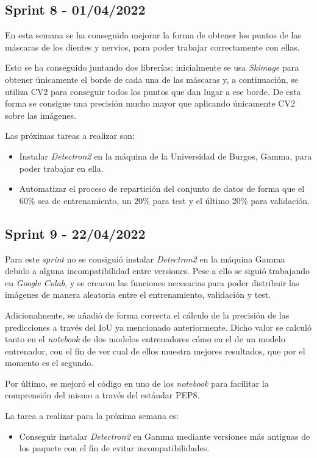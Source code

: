 \subsection{Sprint 8 - 01/04/2022}
En esta semana se ha conseguido mejorar la forma de obtener los puntos de las máscaras de los dientes y nervios, para poder trabajar correctamente con ellas. 

Esto se ha conseguido juntando dos librerías: inicialmente se usa \emph{Skimage} para obtener únicamente el borde de cada una de las máscaras y, a continuación, se utiliza CV2 para conseguir todos los puntos que dan lugar a ese borde. De esta forma se consigue una precisión mucho mayor que aplicando únicamente CV2 sobre las imágenes.

Las próximas tareas a realizar son:
\begin{itemize}
    \item Instalar \emph{Detectron2} en la máquina de la Universidad de Burgos, Gamma, para poder trabajar en ella.
    \item Automatizar el proceso de repartición del conjunto de datos de forma que el 60\% sea de entrenamiento, un 20\% para test y el último 20\% para validación. 
\end{itemize}
\subsection{Sprint 9 - 22/04/2022}
Para este \emph{sprint} no se consiguió instalar \emph{Detectron2} en la máquina Gamma debido a alguna incompatibilidad entre versiones. Pese a ello se siguió trabajando en \emph{Google Colab}, y se crearon las funciones necesarias para poder distribuir las imágenes de manera aleatoria entre el entrenamiento, validación y test. 

Adicionalmente, se añadió de forma correcta el cálculo de la precisión de las predicciones a través del IoU ya mencionado anteriormente. Dicho valor se calculó tanto en el \emph{notebook} de dos modelos entrenadores cómo en el de un modelo entrenador, con el fin de ver cual de ellos muestra mejores resultados, que por el momento es el segundo.

Por último, se mejoró el código en uno de los \emph{notebook} para facilitar la comprensión del mismo a través del estándar PEP8.

La tarea a realizar para la próxima semana es:
\begin{itemize}
    \item Conseguir instalar \emph{Detectron2} en Gamma mediante versiones más antiguas de los paquete con el fin de evitar incompatibilidades.
\end{itemize}
